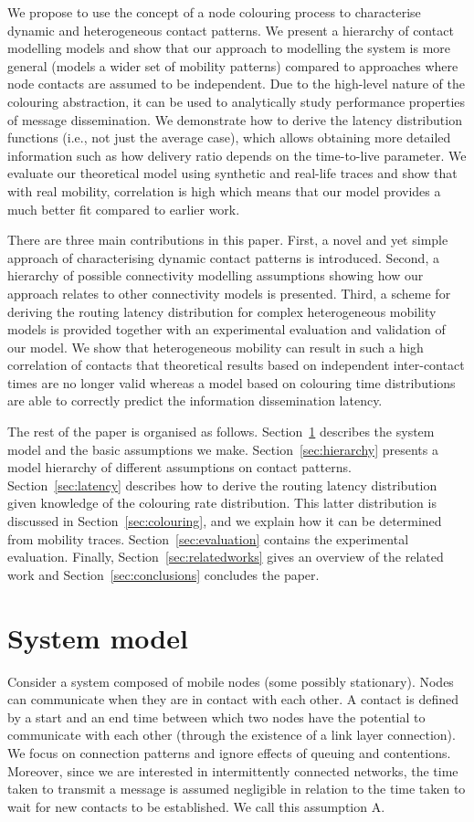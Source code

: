 \documentclass{article}
\begin{document}
We propose to use the concept of a node colouring process to
characterise dynamic and heterogeneous contact patterns. We present a
hierarchy of contact modelling models and show that our approach to
modelling the system is more general (models a wider set of mobility
patterns) compared to approaches where node contacts are assumed to be
independent. Due to the high-level nature of the colouring
abstraction, it can be used to analytically study performance
properties of message dissemination. We demonstrate how to derive the
latency distribution functions (i.e., not just the average case),
which allows obtaining more detailed information such as how delivery
ratio depends on the time-to-live parameter. We evaluate our
theoretical model using synthetic and real-life traces and show that
with real mobility, correlation is high which means that our model
provides a much better fit compared to earlier work.

There are three main contributions in this paper. First, a novel and
yet simple approach of characterising dynamic contact patterns is
introduced. Second, a hierarchy of possible connectivity modelling
assumptions showing how our approach relates to other connectivity
models is presented. Third, a scheme for deriving the routing latency
distribution for complex heterogeneous mobility models is provided
together with an experimental evaluation and validation of our
model. We show that heterogeneous mobility can result in such a high
correlation of contacts that theoretical results based on independent
inter-contact times are no longer valid whereas a model based on
colouring time distributions are able to correctly predict the
information dissemination latency.


The rest of the paper is organised as
follows. Section~\ref{sec:systemmodel} describes the system model and
the basic assumptions we make. Section~\ref{sec:hierarchy} presents a
model hierarchy of different assumptions on contact
patterns. Section~\ref{sec:latency} describes how to derive the
routing latency distribution given knowledge of the colouring rate
distribution. This latter distribution is discussed in
Section~\ref{sec:colouring}, and we explain how it can be determined
from mobility traces. Section~\ref{sec:evaluation} contains the
experimental evaluation. Finally, Section~\ref{sec:relatedworks} gives
an overview of the related work and Section~\ref{sec:conclusions}
concludes the paper.


\section{System model}
\label{sec:systemmodel}
Consider a system composed of  mobile nodes (some possibly
stationary). Nodes can communicate when they are in contact with each
other. A contact is defined by a start and an end time between which
two nodes have the potential to communicate with each other (through
the existence of a link layer connection). We focus on connection
patterns and ignore effects of queuing and contentions. Moreover,
since we are interested in intermittently connected networks, the time
taken to transmit a message is assumed negligible in relation to the
time taken to wait for new contacts to be established. We call this
assumption A.
\end{document}
